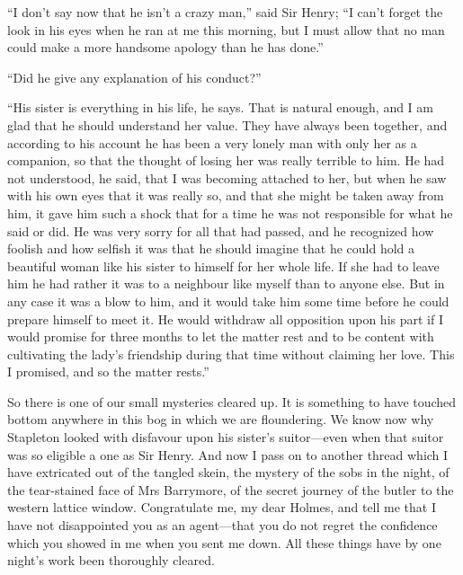 \documentclass[paper=5.5in:8.5in,BCOR=7mm,twoside,DIV=calc,12pt,usegeometry,openany,chapterprefix,endperiod]{scrbook} %
\begin{document}
\enquote{I don't say now that he isn't a crazy man,} said Sir Henry; \enquote{I can't forget the look in his eyes when he ran at me this morning, but I must allow that no man could make a more handsome apology than he has done.}

\enquote{Did he give any explanation of his conduct?}

\enquote{His sister is everything in his life, he says. That is natural enough, and I am glad that he should understand her value. They have always been together, and according to his account he has been a very lonely man with only her as a companion, so that the thought of losing her was really terrible to him. He had not understood, he said, that I was becoming attached to her, but when he saw with his own eyes that it was really so, and that she might be taken away from him, it gave him such a shock that for a time he was not responsible for what he said or did. He was very sorry for all that had passed, and he recognized how foolish and how selfish it was that he should imagine that he could hold a beautiful woman like his sister to himself for her whole life. If she had to leave him he had rather it was to a neighbour like myself than to anyone else. But in any case it was a blow to him, and it would take him some time before he could prepare himself to meet it. He would withdraw all opposition upon his part if I would promise for three months to let the matter rest and to be content with cultivating the lady's friendship during that time without claiming her love. This I promised, and so the matter rests.}

So there is one of our small mysteries cleared up. It is something to have touched bottom anywhere in this bog in which we are floundering. We know now why Stapleton looked with disfavour upon his sister's suitor\nobreakdash---even when that suitor was so eligible a one as Sir Henry. And now I pass on to another thread which I have extricated out of the tangled skein, the mystery of the sobs in the night, of the tear-stained face of Mrs Barrymore, of the secret journey of the butler to the western lattice window. Congratulate me, my dear Holmes, and tell me that I have not disappointed you as an agent\nobreakdash---that you do not regret the confidence which you showed in me when you sent me down. All these things have by one night's work been thoroughly cleared.
\end{document}
